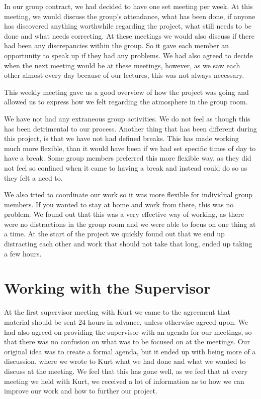 \documentclass{article}
\begin{document}
In our group contract, we had decided to have one set meeting per week.
At this meeting, we would discuss the group's attendance, what has been done, if anyone has discovered anything worthwhile regarding the project, what still needs to be done and what needs correcting. 
At these meetings we would also discuss if there had been any discrepancies within the group.
So it gave each member an opportunity to speak up if they had any problems.
We had also agreed to decide when the next meeting would be at these meetings, however, as we saw each other almost every day because of our lectures, this was not always necessary.

This weekly meeting gave us a good overview of how the project was going and allowed us to express how we felt regarding the atmosphere in the group room. 

We have not had any extraneous group activities. 
We do not feel as though this has been detrimental to our process.
Another thing that has been different during this project, is that we have not had defined breaks. 
This has made working much more flexible, than it would have been if we had set specific times of day to have a break. 
Some group members preferred this more flexible way, as they did not feel so confined when it came to having a break and instead could do so as they felt a need to.

We also tried to coordinate our work so it was more flexible for individual group members.
If you wanted to stay at home and work from there, this was no problem.
We found out that this was a very effective way of working, as there were no distractions in the group room and we were able to focus on one thing at a time.
At the start of the project we quickly found out that we end up distracting each other and work that should not take that long, ended up taking a few hours.

\section{Working with the Supervisor}
At the first supervisor meeting with Kurt we came to the agreement that material should be sent 24 hours in advance, unless otherwise agreed upon. 
We had also agreed on providing the supervisor with an agenda for our meetings, so that there was no confusion on what was to be focused on at the meetings. 
Our original idea was to create a formal agenda, but it ended up with being more of a discussion, where we wrote to Kurt what we had done and what we wanted to discuss at the meeting. 
We feel that this has gone well, as we feel that at every meeting we held with Kurt, we received a lot of information as to how we can improve our work and how to further our project.
\end{document}
